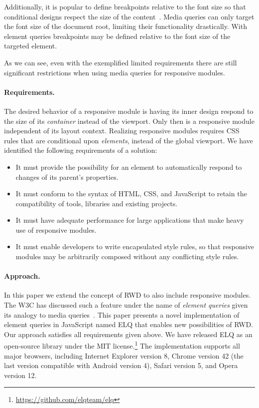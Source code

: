\documentclass[sigplan,9pt]{acmart}
\newcommand{\elq}{ELQ}
\begin{document}
    Additionally, it is popular to define breakpoints relative to the font size so that conditional designs respect the size of the content~\cite{mq-em}.
    Media queries can only target the font size of the document root, limiting their functionality drastically.
    With element queries breakpoints may be defined relative to the font size of the targeted element.

    As we can see, even with the exemplified limited requirements there are still significant restrictions when using media queries for responsive modules.


  \paragraph{Requirements.}\label{sec:reqs}
    The desired behavior of a responsive module is having its inner design respond to the size of its \emph{container} instead of the viewport.
    Only then is a responsive module independent of its layout context.
    Realizing responsive modules requires CSS rules that are conditional upon \emph{elements}, instead of the global viewport.
    We have identified the following requirements of a solution:

    \begin{itemize}
      \item
        It must provide the possibility for an element to automatically respond to changes of its parent's properties.
      \item
        It must conform to the syntax of HTML, CSS, and JavaScript to retain the compatibility of tools, libraries and existing projects.
      \item
        It must have adequate performance for large applications that make heavy use of responsive modules.
      \item
        It must enable developers to write encapsulated style rules, so that responsive modules may be arbitrarily composed without any conflicting style rules.
    \end{itemize}
  \paragraph{Approach.}
    In this paper we extend the concept of RWD to also include responsive modules.
    The W3C has discussed such a feature under the name of \emph{element queries} given its analogy to media queries~\cite{w3c_eq_mail}.
    This paper presents a novel implementation of element queries in JavaScript named \elq{} that enables new possibilities of RWD.
    Our approach satisfies all requirements given above.
    We have released ELQ as an open-source library under the MIT license.\footnote{\url{https://github.com/elqteam/elq}}
    The implementation supports all major browsers, including Internet Explorer version 8, Chrome version 42 (the last version compatible with Android version 4), Safari version 5, and Opera version 12.
\end{document}
